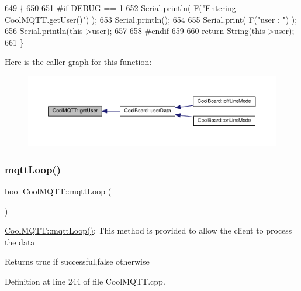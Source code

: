 \begin{DoxyCode}
649 \{
650 
651 \textcolor{preprocessor}{#if DEBUG == 1 }
652     Serial.println( F(\textcolor{stringliteral}{"Entering CoolMQTT.getUser()"}) );
653     Serial.println();
654     
655     Serial.print( F(\textcolor{stringliteral}{"user : "}) );
656     Serial.println(this->\hyperlink{classCoolMQTT_a8cd47e45d457f908d4b4390b35aaee83}{user});
657 
658 \textcolor{preprocessor}{#endif}
659 
660     \textcolor{keywordflow}{return} String(this->\hyperlink{classCoolMQTT_a8cd47e45d457f908d4b4390b35aaee83}{user});
661 \}
\end{DoxyCode}
Here is the caller graph for this function\+:
\nopagebreak
\begin{figure}[H]
\begin{center}
\leavevmode
\includegraphics[width=350pt]{classCoolMQTT_a373cc92fca7760d886f02d8a6e5b3f63_icgraph}
\end{center}
\end{figure}
\mbox{\label{classCoolMQTT_aa5eaae967b562b62cbcf2b8d81f6e5d5}} 
\subsubsection{\texorpdfstring{mqtt\+Loop()}{mqttLoop()}}
{\footnotesize\ttfamily bool Cool\+M\+Q\+T\+T\+::mqtt\+Loop (\begin{DoxyParamCaption}{ }\end{DoxyParamCaption})}

\hyperlink{classCoolMQTT_aa5eaae967b562b62cbcf2b8d81f6e5d5}{Cool\+M\+Q\+T\+T\+::mqtt\+Loop()}\+: This method is provided to allow the client to process the data

\begin{DoxyReturn}{Returns}
true if successful,false otherwise 
\end{DoxyReturn}


Definition at line 244 of file Cool\+M\+Q\+T\+T.\+cpp.



